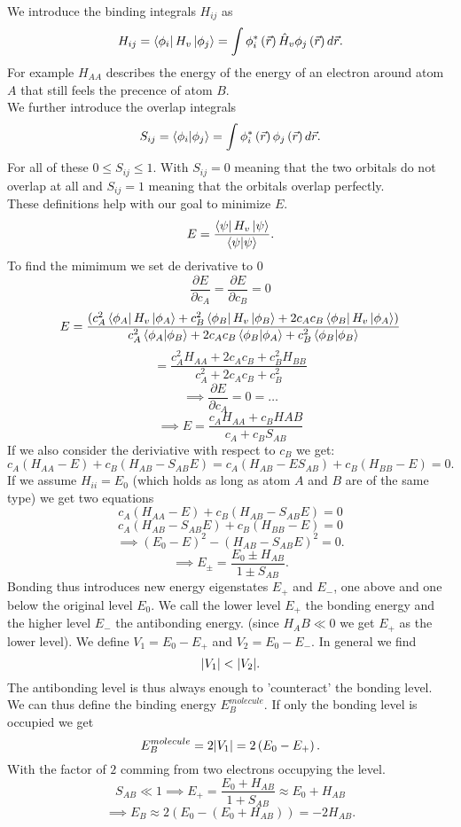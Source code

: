\documentclass{report}
\begin{document}
We introduce the binding integrals $H_{ij}$ as \[
	H_{ij} = \bra{\phi_i} H_v \ket{\phi_j}  = \int \phi_i^*\left( \vec{r} \right) \hat{H}_v \phi_j\left( \vec{r} \right) d\vec{r}
.\] For example $H_{A A}$ describes the energy of the energy of an electron around atom $A$ that still feels the precence of atom $B$.\\
We further introduce the overlap integrals \[
	S_{ij} = \bra{\phi_i} \ket{\phi_j} = \int \phi_i^*\left( \vec{r} \right) \phi_j\left( \vec{r} \right) d\vec{r}
.\] For all of these $0 \le S_{i j} \le 1 $. With $S_{ij} = 0$ meaning that the two orbitals do not overlap at all and $S_{ij} = 1$ meaning that the orbitals overlap perfectly.\\
These definitions help with our goal to minimize $E$.\[
E = \frac{\bra{\psi } H_v \ket{\psi } }{\bra{\psi } \ket{\psi } }
.\] To find the mimimum we set de derivative to $0$ \[
\frac{\partial E}{\partial c_A} = \frac{\partial E}{\partial c_B} = 0
\] \[
E = \frac{(c_A^2 \bra{\phi_A} H_v \ket{\phi_A} + c_B^2 \bra{\phi_B} H_v \ket{\phi_B} + 2c_Ac_B \bra{\phi_B} H_v \ket{\phi_A})}{c_A^2 \bra{\phi_A} \ket{\phi_B} + 2c_Ac_B \bra{\phi_B} \ket{\phi_A} +c_B^2 \bra{\phi_B} \ket{\phi_B}}
\]  \[
= \frac{c_A^2 H_{A A} + 2c_Ac_B + c_B^2 H_{BB}}{c_A^2 + 2 c_Ac_B + c_B^2}
\] \[
\implies \frac{\partial E}{\partial c_A} = 0 = \text{\ldots}
\] \[
\implies E = \frac{c_A H_{A A} + c_B H{AB}}{c_A + c_B S_{AB}}
\]If we also consider the deriviative with respect to $c_B$ we get: \[
c_A\left( H_{A A } - E \right) + c_B\left( H_{AB} - S_{AB}E \right) = c_A\left( H_{AB} - ES_{AB} \right) + c_B\left( H_{BB} - E \right) =0
.\] If we assume $H_{ii} = E_0$ (which holds as long as atom $A$ and $B$ are of the same type) we get two equations \[
c_A\left( H_{A A} - E \right) + c_B \left( H_{AB} - S_{AB}E \right) = 0 
\]\[
c_A\left( H_{AB} - S_{AB}E \right) + c_B \left( H_{BB} - E \right) = 0
\] \[
\implies \left( E_0 - E \right) ^2 - \left( H_{AB} - S_{AB}E \right) ^2 = 0
.\]   \[
\implies E_{\pm} = \frac{E_0 \pm H_{AB}}{1 \pm S_{AB}}
.\] Bonding thus introduces new energy eigenstates $E_+$ and $E_-$, one above and one below the original level $E_0$. We call the lower level $E_+$ the bonding energy and the higher level  $E_-$ the antibonding energy. (since $H_AB \ll 0$ we get $E_+$ as the lower level). We define  $V_1 = E_0 - E_+$ and $V_2 = E_0 - E_-$. In general we find  \[
\abs{V_1} < \abs{V_2}
.\] 
The antibonding level is thus always enough to 'counteract' the bonding level.\\
We can thus define the binding energy $E_B^{molecule}$. If only the bonding level is occupied we get \[
	E_B^{molecule} = 2 \abs{V_1} = 2\left( E_0 - E_+ \right) 
.\] With the factor of $2$ comming from two electrons occupying the level. \[
S_{AB} \ll 1 \implies E_+ = \frac{E_0 + H_{AB}}{1 + S_{AB}} \approx E_0 + H_{AB}
\] \[
\implies E_B \approx 2\left( E_0 - \left( E_0 + H_{AB} \right)  \right) = -2 H_{AB}
.\]  
\end{document}
